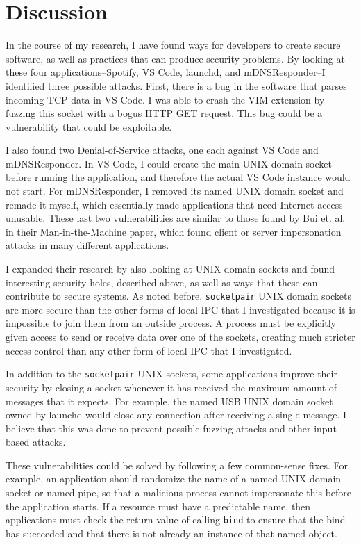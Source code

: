 \chapter{Discussion}
\label{sec:discussion}
In the course of my research, I have found ways for developers to create secure software, as well as practices that can produce security problems.  By looking at these four applications--Spotify, VS Code, launchd, and mDNSResponder--I identified three possible attacks.  First, there is a bug in the software that parses incoming TCP data in VS Code.  I was able to crash the VIM extension by fuzzing this socket with a bogus HTTP GET request.  This bug could be a vulnerability that could be exploitable.

I also found two Denial-of-Service attacks, one each against VS Code and mDNSResponder.  In VS Code, I could create the main UNIX domain socket before running the application, and therefore the actual VS Code instance would not start.  For mDNSResponder, I removed its named UNIX domain socket and remade it myself, which essentially made applications that need Internet access unusable.  These last two vulnerabilities are similar to those found by Bui et. al. in their Man-in-the-Machine paper, which found client or server impersonation attacks in many different applications.

I expanded their research by also looking at UNIX domain sockets and found interesting security holes, described above, as well as ways that these can contribute to secure systems.  As noted before, \texttt{socketpair} UNIX domain sockets are more secure than the other forms of local IPC that I investigated because it is impossible to join them from an outside process.  A process must be explicitly given access to send or receive data over one of the sockets, creating much stricter access control than any other form of local IPC that I investigated.

In addition to the \texttt{socketpair} UNIX sockets, some applications improve their security by closing a socket whenever it has received the maximum amount of messages that it expects.  For example, the named USB UNIX domain socket owned by launchd would close any connection after receiving a single message.  I believe that this was done to prevent possible fuzzing attacks and other input-based attacks.

These vulnerabilities could be solved by following a few common-sense fixes.  For example, an application should randomize the name of a named UNIX domain socket or named pipe, so that a malicious process cannot impersonate this before the application starts.  If a resource must have a predictable name, then applications must check the return value of calling \texttt{bind} to ensure that the bind has succeeded and that there is not already an instance of that named object.

